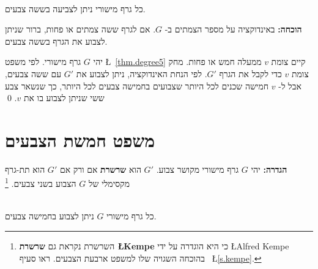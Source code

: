 \begin{theorem}\label{thm.sixcolor}\mbox{}\\
כל גרף מישורי ניתן לצביעה בששה צבעים.
\end{theorem}
\textbf{הוכחה:}
באינדוקציה על מספר הצמתים ב-%
$G$.
אם לגרף ששה צמתים או פחות, ברור שניתן לצבוע את הגרף בששה צבעים.

יהי
$G$
גרף מישורי. לפי משפט
\L{~\ref{thm.degree5}}
קיים צומת
$v$
ממעלה חמש או פחות. מחק צומת
$v$
כדי לקבל את הגרף
$G'$.
לפי הנחת האינדוקציה, ניתן לצבוע את
$G'$
עם ששה צבעים, אבל ל-%
$v$
חמישה שכנים לכל היותר שצבועים בחמישה 
צבעים לכל היותר, כך שנשאר צבע ששי שניתן לצבוע בו את
$v$. \qed

\begin{center}
\end{center}


\section{משפט חמשת הצבעים}

\textbf{הגדרה:}
יהי
$G$
גרף מישורי מקושר צבוע. 
$G'$
הוא
\textbf{שרשרת}
אם ורק אם
$G'$
הוא תת-גרף מקסימלי של
$G$
הצבוע בשני צבעים.%
\footnote{%
השרשרת נקראת גם
\textbf{שרשרת \L{Kempe}}
כי היא הוגדרה על ידי
\L{Alfred Kempe}
בהוכחה השגויה שלו למשפט ארבעת הצבעים. ראו סעיף~%
\L{\ref{s.kempe}}.}

\begin{theorem}\label{thm.fivecolor}\mbox{}\\
כל גרף מישורי 
$G$
ניתן לצבוע בחמישה צבעים.
\end{theorem}

